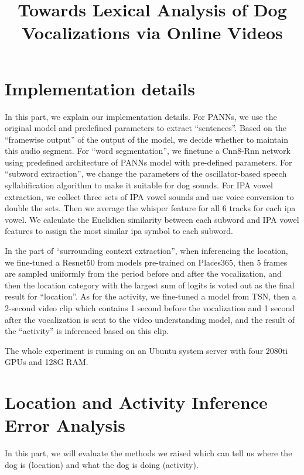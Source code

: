 \documentclass[letterpaper]{article}
\title{Towards Lexical Analysis of Dog Vocalizations via Online Videos}
\begin{document}
\maketitle
\appendix

\section{Implementation details}
In this part, we explain our implementation details. For PANNs, we use the original model and predefined parameters to extract ``sentences''. Based on the ``framewise output'' of the output of the model, we decide whether to maintain this audio segment. For ``word segmentation'', we finetune a Cnn8-Rnn network using predefined architecture of PANNs model with pre-defined parameters. For ``subword extraction'', we change the parameters of the oscillator-based speech syllabification algorithm to make it suitable for dog sounds. For IPA vowel extraction, we collect three sets of IPA vowel sounds and use voice conversion to double the sets. Then we average the whisper feature for all 6 tracks for each ipa vowel. We calculate the Euclidien similarity between each subword and IPA vowel features to assign the most similar ipa symbol to each subword. 

In the part of ``surrounding context extraction'', when inferencing the location, we fine-tuned a Resnet50 from models pre-trained on Places365, then 5 frames are sampled uniformly from the period before and after the vocalization, and then the location category with the largest sum of logits is voted out as the final result for ``location''. As for the activity, we fine-tuned a model from TSN, then a 2-second video clip which contains 1 second before the vocalization and 1 second after the vocalization is sent to the video understanding model, and the result of the ``activity'' is inferenced based on this clip. 

The whole experiment is running on an Ubuntu system server with four 2080ti GPUs and 128G RAM. 

\section{Location and Activity Inference Error Analysis}

In this part, we will evaluate the methods we raised which can tell us where the dog is (location) and what the dog is doing (activity). 
\end{document}
